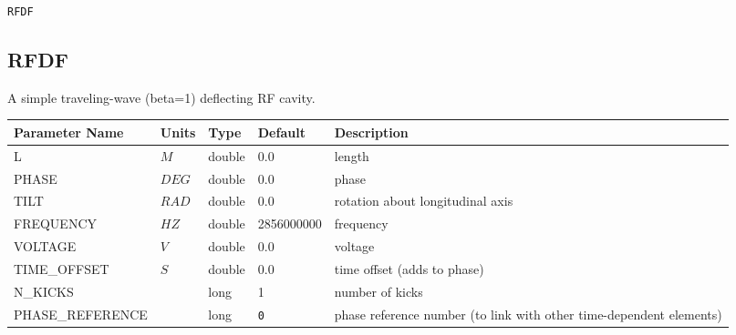 \vspace*{0.5in}

\begin{latexonly}
\newpage
\begin{center}{\Large\verb|RFDF|}\end{center}
\end{latexonly}\subsection{RFDF}
A simple traveling-wave (beta=1) deflecting RF cavity.
\\
\begin{tabular}{|l|l|l|l|p{\descwidth}|} \hline
Parameter Name & Units & Type & Default & Description \\ \hline 
L & $M$ & double &  0.0 & length  \\ \hline 
PHASE & $DEG$ & double &  0.0 & phase  \\ \hline 
TILT & $RAD$ & double &  0.0 & rotation about longitudinal axis  \\ \hline 
FREQUENCY & $HZ$ & double &   2856000000 & frequency  \\ \hline 
VOLTAGE & $V$ & double &  0.0 & voltage  \\ \hline 
TIME\_OFFSET & $S$ & double &  0.0 & time offset (adds to phase)  \\ \hline 
N\_KICKS &  & long &   1               & number of kicks  \\ \hline 
PHASE\_REFERENCE &  & long &  \verb|0| & phase reference number (to link with other time-dependent elements)  \\ \hline 
\end{tabular}

